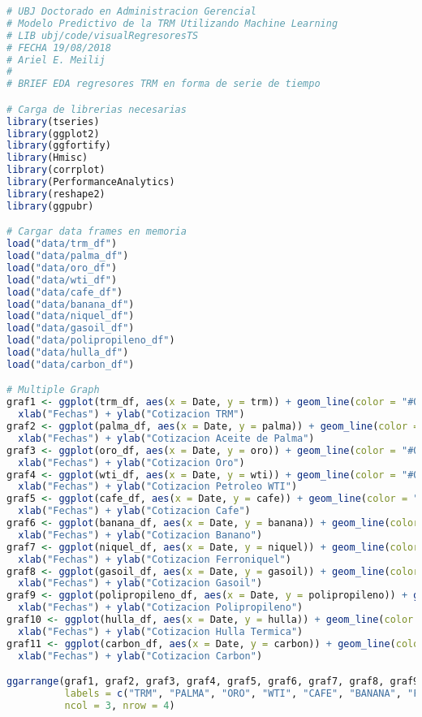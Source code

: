 \begin{lstlisting}[language=R]
# UBJ Doctorado en Administracion Gerencial
# Modelo Predictivo de la TRM Utilizando Machine Learning
# LIB ubj/code/visualRegresoresTS 
# FECHA 19/08/2018
# Ariel E. Meilij
#
# BRIEF EDA regresores TRM en forma de serie de tiempo

# Carga de librerias necesarias
library(tseries)
library(ggplot2)
library(ggfortify)
library(Hmisc)
library(corrplot)
library(PerformanceAnalytics)
library(reshape2)
library(ggpubr)

# Cargar data frames en memoria
load("data/trm_df")
load("data/palma_df")
load("data/oro_df")
load("data/wti_df")
load("data/cafe_df")
load("data/banana_df")
load("data/niquel_df")
load("data/gasoil_df")
load("data/polipropileno_df")
load("data/hulla_df")
load("data/carbon_df")

# Multiple Graph
graf1 <- ggplot(trm_df, aes(x = Date, y = trm)) + geom_line(color = "#00AFBB", size = 1) + 
  xlab("Fechas") + ylab("Cotizacion TRM")
graf2 <- ggplot(palma_df, aes(x = Date, y = palma)) + geom_line(color = "#00AFBB", size = 1) + 
  xlab("Fechas") + ylab("Cotizacion Aceite de Palma")
graf3 <- ggplot(oro_df, aes(x = Date, y = oro)) + geom_line(color = "#00AFBB", size = 1) + 
  xlab("Fechas") + ylab("Cotizacion Oro")
graf4 <- ggplot(wti_df, aes(x = Date, y = wti)) + geom_line(color = "#00AFBB", size = 1) + 
  xlab("Fechas") + ylab("Cotizacion Petroleo WTI")
graf5 <- ggplot(cafe_df, aes(x = Date, y = cafe)) + geom_line(color = "#00AFBB", size = 1) + 
  xlab("Fechas") + ylab("Cotizacion Cafe")
graf6 <- ggplot(banana_df, aes(x = Date, y = banana)) + geom_line(color = "#00AFBB", size = 1) + 
  xlab("Fechas") + ylab("Cotizacion Banano")
graf7 <- ggplot(niquel_df, aes(x = Date, y = niquel)) + geom_line(color = "#00AFBB", size = 1) + 
  xlab("Fechas") + ylab("Cotizacion Ferroniquel")
graf8 <- ggplot(gasoil_df, aes(x = Date, y = gasoil)) + geom_line(color = "#00AFBB", size = 1) + 
  xlab("Fechas") + ylab("Cotizacion Gasoil")
graf9 <- ggplot(polipropileno_df, aes(x = Date, y = polipropileno)) + geom_line(color = "#00AFBB", size = 1) + 
  xlab("Fechas") + ylab("Cotizacion Polipropileno")
graf10 <- ggplot(hulla_df, aes(x = Date, y = hulla)) + geom_line(color = "#00AFBB", size = 1) + 
  xlab("Fechas") + ylab("Cotizacion Hulla Termica")
graf11 <- ggplot(carbon_df, aes(x = Date, y = carbon)) + geom_line(color = "#00AFBB", size = 1) + 
  xlab("Fechas") + ylab("Cotizacion Carbon")

ggarrange(graf1, graf2, graf3, graf4, graf5, graf6, graf7, graf8, graf9, graf10, graf11 + rremove("x.text"), 
          labels = c("TRM", "PALMA", "ORO", "WTI", "CAFE", "BANANA", "FERRONIQUEL", "GASOIL", "POLIPROPILENO", "HULLA TERMICA", "CARBON" ),
          ncol = 3, nrow = 4)
\end{lstlisting}

